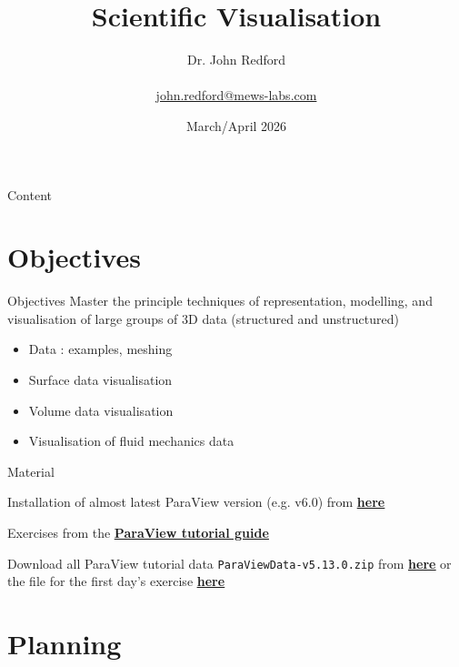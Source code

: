 \documentclass{beamer}
\title[Scientific Visualisation]{Scientific Visualisation}
\author{Dr. John Redford\\ \\ \tiny\href{mailto:john.redford@mews-labs.com}{john.redford@mews-labs.com}}
\institute{\href{https://www.mews-labs.com/}{\underline{Mews Labs}}, Cachan, France}
\date{March/April 2026}
\begin{document}
\begin{frame}
  \titlepage
\end{frame}

\begin{frame}{Content}
  \tableofcontents
\end{frame}

\section{Objectives}

\begin{frame}{Objectives}
  Master the principle techniques of representation, modelling, and visualisation of large groups of 3D data (structured and unstructured)

  \begin{itemize}
    \item Data : examples, meshing
    \item Surface data visualisation
    \item Volume data visualisation
    \item Visualisation of fluid mechanics data
  \end{itemize}{}
    
    
\end{frame}{}

\begin{frame}{Material}
    
    Installation of almost latest ParaView version (e.g. v6.0) from \href{https://www.paraview.org/download/}{\bf\underline{here}}
    
    \vskip 24pt
    
    Exercises from the \href{https://docs.paraview.org/en/latest/Tutorials/index.html}{\bf\underline{ParaView tutorial guide}}
    
    
    \vskip 24pt
    
    Download all ParaView tutorial data \texttt{ParaViewData-v5.13.0.zip} from 
    \href{https://www.paraview.org/download/}{\bf\underline{here}} or the file for the first day's exercise \href{http://tacc.github.io/pvOSPRay/demos/data/disk_out_ref.ex2}{\bf\underline{here}}
    
\end{frame}{}

\section{Planning}
\end{document}
